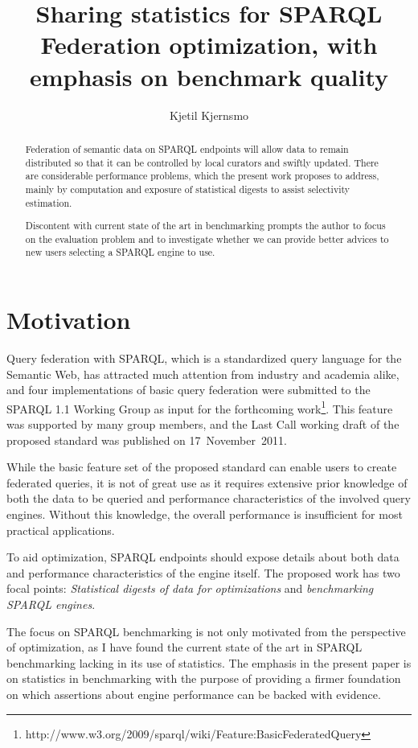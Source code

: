 \documentclass{llncs}
\title{Sharing statistics for SPARQL Federation optimization, with
  emphasis on benchmark quality}
\author{Kjetil Kjernsmo\inst{1}}
\institute{Department of Informatics,
Postboks 1080 Blindern,
0316 Oslo, Norway
\email{kjekje@ifi.uio.no}}
\begin{document}
\maketitle



\begin{abstract}
  Federation of semantic data on SPARQL endpoints will allow data to
  remain distributed so that it can be controlled by local curators
  and swiftly updated. There are considerable performance problems,
  which the present work proposes to address, mainly by computation
  and exposure of statistical digests to assist selectivity
  estimation.

  Discontent with current state of the art in benchmarking prompts the
  author to focus on the evaluation problem and to investigate whether
  we can provide better advices to new users selecting a SPARQL engine
  to use.
\end{abstract}

\section{Motivation}

Query federation with SPARQL, which is a standardized query language
for the Semantic Web, has attracted much attention
from industry and academia alike, and four implementations of basic
query federation were submitted to the SPARQL 1.1 Working Group as
input for the forthcoming
work\footnote{http://www.w3.org/2009/sparql/wiki/Feature:BasicFederatedQuery}. 
This feature was
supported by many group members, and the Last Call working
draft of the proposed standard was published on 17~November~2011.

While the basic feature set of the proposed standard can enable users
to create federated queries, it is not of great use as it requires
extensive prior knowledge of both the data to be queried and
performance characteristics of the involved query engines. Without
this knowledge, the overall performance is insufficient for most
practical applications.

To aid optimization, SPARQL endpoints should expose details about both
data and performance characteristics of the engine itself. The
proposed work has two focal points: \emph{Statistical digests of
  data for optimizations} and \emph{benchmarking SPARQL engines}. 

The focus on SPARQL benchmarking is not only motivated from the
perspective of optimization, as I have found the current state of the art
in SPARQL benchmarking lacking in its use of statistics. The emphasis
in the present paper is on statistics in benchmarking with the purpose
of providing a firmer foundation on which assertions about engine
performance can be backed with evidence. 
\end{document}
